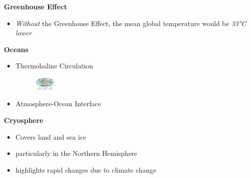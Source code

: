 \documentclass[fontsize=8pt, a4paper, landscape, fleqn]{scrartcl}
\renewcommand{\subsection}[1]{%
    \noindent\colorbox{subsectioncolor}{%
        \parbox{\dimexpr\columnwidth-2\fboxsep}{\color{white}\textbf{#1}}}%
    \vspace{0.5mm}%
}
\begin{document}
\begin{multicols*}{3}[\raggedcolumns]
\subsection{Greenhouse Effect}
\begin{itemize}
    \item \textit{Without} the Greenhouse Effect, the mean global temperature would be \textit{33°C lower}
\end{itemize}

\subsection{Oceans}
\begin{itemize}
    \item Thermohaline Circulation 
    \begin{figure}
        \centering
        \includegraphics[width=0.1\textwidth]{Secondary/img/Pasted image 20250407171910.png}
    \end{figure}
    \item Atmosphere-Ocean Interface 
\end{itemize}

\subsection{Cryosphere}
\begin{itemize}
    \item Covers land and sea ice
    \item particularly in the Northern Hemisphere
    \item highlights rapid changes due to climate change
\end{itemize}


\end{multicols*}
\end{document}
